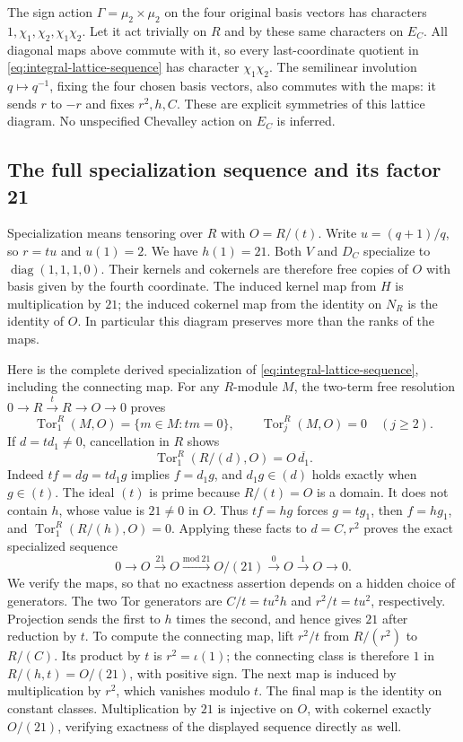 The sign action $\Gamma=\mu_2\times\mu_2$ on the four original basis
vectors has characters $1,\chi_1,\chi_2,\chi_1\chi_2$.
Let it act trivially on $R$ and by these same characters on $E_C$.
All diagonal maps above commute with it, so every last-coordinate
quotient in \eqref{eq:integral-lattice-sequence} has character
$\chi_1\chi_2$. The semilinear involution $q\mapsto q^{-1}$, fixing
the four chosen basis vectors, also commutes with the maps: it sends
$r$ to $-r$ and fixes $r^2,h,C$. These are explicit symmetries of this
lattice diagram. No unspecified Chevalley action on $E_C$ is inferred.

\subsection{The full specialization sequence and its factor 21}

Specialization means tensoring over $R$ with $O=R/(t)$.
Write $u=(q+1)/q$, so $r=tu$ and $u(1)=2$.
We have $h(1)=21$. Both $V$ and $D_C$ specialize to
$\operatorname{diag}(1,1,1,0)$. Their kernels and cokernels are therefore
free copies of $O$ with basis given by the fourth coordinate.
The induced kernel map from $H$ is multiplication by $21$; the induced
cokernel map from the identity on $N_R$ is the identity of $O$.
In particular this diagram preserves more than the ranks of the maps.

Here is the complete derived specialization of
\eqref{eq:integral-lattice-sequence}, including the connecting map.
For any $R$-module $M$, the two-term free resolution
$0\to R\xrightarrow{t}R\to O\to0$ proves
\[
 \operatorname{Tor}_1^R(M,O)=\{m\in M:tm=0\},\qquad
 \operatorname{Tor}_j^R(M,O)=0\quad(j\ge2).
\]
If $d=td_1\ne0$, cancellation in $R$ shows
\[
 \operatorname{Tor}_1^R(R/(d),O)=O\,\overline{d_1}.
\]
Indeed $tf=dg=td_1g$ implies $f=d_1g$, and $d_1g\in(d)$ holds
exactly when $g\in(t)$. The ideal $(t)$ is prime because $R/(t)=O$
is a domain. It does not contain $h$, whose value is $21\ne0$ in $O$.
Thus $tf=hg$ forces $g=tg_1$, then $f=hg_1$, and
$\operatorname{Tor}_1^R(R/(h),O)=0$. Applying these facts to $d=C,r^2$ proves the
exact specialized sequence
\begin{equation}\label{eq:integral-specialization-21}
 0\longrightarrow O\xrightarrow{\,21\,}O
 \xrightarrow{\mathrm{mod}\ 21}O/(21)
 \xrightarrow{\,0\,}O\xrightarrow{\,1\,}O\longrightarrow0.
\end{equation}
We verify the maps, so that no exactness assertion depends on a hidden
choice of generators. The two Tor generators are $C/t=tu^2h$ and
$r^2/t=tu^2$, respectively. Projection sends the first to $h$ times the
second, and hence gives $21$ after reduction by $t$.
To compute the connecting map, lift $r^2/t$ from $R/(r^2)$ to
$R/(C)$. Its product by $t$ is $r^2=\iota(1)$; the connecting class
is therefore $1$ in $R/(h,t)=O/(21)$, with positive sign. The next map
is induced by multiplication by $r^2$, which vanishes modulo $t$.
The final map is the identity on constant classes. Multiplication by
$21$ is injective on $O$, with cokernel exactly $O/(21)$, verifying
exactness of the displayed sequence directly as well.

